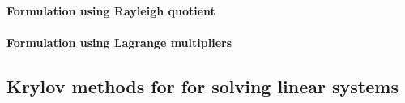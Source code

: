         \paragraph{Formulation using Rayleigh quotient}

        \paragraph{Formulation using Lagrange multipliers}


  \subsection{Krylov methods for for solving linear systems}
  \label{subsubsec: theory -- krylov methods}
